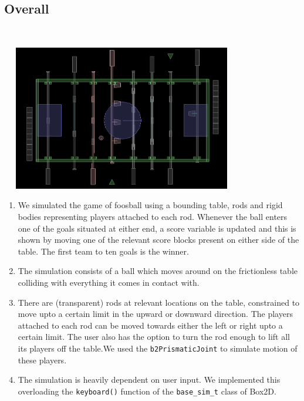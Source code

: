 \documentclass{article}
\begin{document}
\subsection{Overall}~\\
\begin{center}
\includegraphics[width=300pt,height=180pt]{Foosball_Simulation}~\\
\end{center}
\begin{enumerate}
\item We simulated the game of foosball using a bounding table, rods and rigid bodies representing players attached to each rod. Whenever the ball enters one of the goals situated at either end, a score variable is updated and this is shown by moving one of the relevant score blocks present on either side of the table. The first team to ten goals is the winner.\\
\item The simulation consists of a ball which moves around on the frictionless table colliding with everything it comes in contact with.\\
\item There are (transparent) rods at relevant locations on the table, constrained to move upto a certain limit in the upward or downward direction. The players attached to each rod can be moved towards either the left or right upto a certain limit. The user also has the option to turn the rod enough to lift all its players off the table.We used the \texttt{b2PrismaticJoint} to simulate motion of these players.\\
\item The simulation is heavily dependent on user input. We implemented this overloading the \texttt{keyboard()} function of the \texttt{base\_sim\_t} class of Box2D.\\ \\

\end{enumerate}
\end{document}
